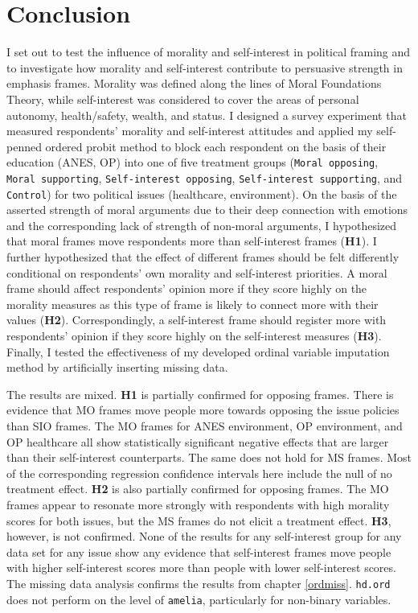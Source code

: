 \documentclass[12pt,econ]{sources/authesis}
\begin{document}
\hypertarget{framing-conclusion}{%
\section{Conclusion}\label{framing-conclusion}}

I set out to test the influence of morality and self-interest in political framing and to investigate how morality and self-interest contribute to persuasive strength in emphasis frames. Morality was defined along the lines of Moral Foundations Theory, while self-interest was considered to cover the areas of personal autonomy, health/safety, wealth, and status. I designed a survey experiment that measured respondents' morality and self-interest attitudes and applied my self-penned ordered probit method to block each respondent on the basis of their education (ANES, OP) into one of five treatment groups (\texttt{Moral\ opposing}, \texttt{Moral\ supporting}, \texttt{Self-interest\ opposing}, \texttt{Self-interest\ supporting}, and \texttt{Control}) for two political issues (healthcare, environment). On the basis of the asserted strength of moral arguments due to their deep connection with emotions and the corresponding lack of strength of non-moral arguments, I hypothesized that moral frames move respondents more than self-interest frames (\textbf{H1}). I further hypothesized that the effect of different frames should be felt differently conditional on respondents' own morality and self-interest priorities. A moral frame should affect respondents' opinion more if they score highly on the morality measures as this type of frame is likely to connect more with their values (\textbf{H2}). Correspondingly, a self-interest frame should register more with respondents' opinion if they score highly on the self-interest measures (\textbf{H3}). Finally, I tested the effectiveness of my developed ordinal variable imputation method by artificially inserting missing data.

The results are mixed. \textbf{H1} is partially confirmed for opposing frames. There is evidence that MO frames move people more towards opposing the issue policies than SIO frames. The MO frames for ANES environment, OP environment, and OP healthcare all show statistically significant negative effects that are larger than their self-interest counterparts. The same does not hold for MS frames. Most of the corresponding regression confidence intervals here include the null of no treatment effect. \textbf{H2} is also partially confirmed for opposing frames. The MO frames appear to resonate more strongly with respondents with high morality scores for both issues, but the MS frames do not elicit a treatment effect. \textbf{H3}, however, is not confirmed. None of the results for any self-interest group for any data set for any issue show any evidence that self-interest frames move people with higher self-interest scores more than people with lower self-interest scores. The missing data analysis confirms the results from chapter \ref{ordmiss}. \texttt{hd.ord} does not perform on the level of \texttt{amelia}, particularly for non-binary variables.
\end{document}
